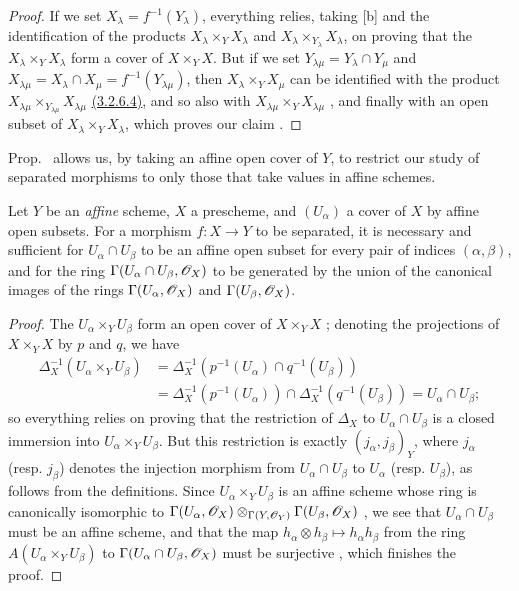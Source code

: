 \begin{proof}
\label{proof-1.5.5.5}
If we set $X_\lambda=f^{-1}(Y_\lambda)$, everything relies, taking [b] and the identification of the products $X_\lambda\times_Y X_\lambda$ and $X_\lambda\times_{Y_\lambda}X_\lambda$, on proving that the $X_\lambda\times_Y X_\lambda$ form a cover of $X\times_Y X$.
But if we set $Y_{\lambda\mu}=Y_\lambda\cap Y_\mu$ and $X_{\lambda\mu}=X_\lambda\cap X_\mu=f^{-1}(Y_{\lambda\mu})$, then $X_\lambda\times_Y X_\mu$ can be identified with the product $X_{\lambda\mu}\times_{Y_{\lambda\mu}}X_{\lambda\mu}$ \hyperref[1.3.2.6]{(3.2.6.4)}, and so also with $X_{\lambda\mu}\times_Y X_{\lambda\mu}$ , and finally with an open subset of $X_\lambda\times_Y X_\lambda$, which proves our claim .
\end{proof}

Prop.~ allows us, by taking an affine open cover of $Y$, to restrict our study of separated morphisms to only those that take values in affine schemes.

\begin{prop}[5.5.6]
\label{1.5.5.6}
Let $Y$ be an \emph{affine} scheme, $X$ a prescheme, and $(U_\alpha)$ a cover of $X$ by affine open subsets.
For a morphism $f:X\to Y$ to be separated, it is necessary and sufficient for $U_\alpha\cap U_\beta$ to be an affine open subset for every pair of indices $(\alpha,\beta)$, and for the ring $\Gamma(U_\alpha\cap U_\beta,\mathscr{O}_X)$ to be generated by the union of the canonical images of the rings $\Gamma(U_\alpha,\mathscr{O}_X)$ and $\Gamma(U_\beta,\mathscr{O}_X)$.
\end{prop}

\begin{proof}
\label{proof-1.5.5.6}
The $U_\alpha\times_Y U_\beta$ form an open cover of $X\times_Y X$ ;
denoting the projections of $X\times_Y X$ by $p$ and $q$, we have
\begin{align*}
  \Delta_X^{-1}(U_\alpha\times_Y U_\beta)&=\Delta_X^{-1}(p^{-1}(U_\alpha)\cap q^{-1}(U_\beta))\\
                                         &=\Delta_X^{-1}(p^{-1}(U_\alpha))\cap\Delta_X^{-1}(q^{-1}(U_\beta))=U_\alpha\cap U_\beta;
\end{align*}
so everything relies on proving that the restriction of $\Delta_X$ to $U_\alpha\cap U_\beta$ is a closed immersion into $U_\alpha\times_Y U_\beta$.
But this restriction is exactly $(j_\alpha,j_\beta)_Y$, where $j_\alpha$ (resp. $j_\beta$) denotes the injection morphism from $U_\alpha\cap U_\beta$ to $U_\alpha$ (resp. $U_\beta$), as follows from the definitions.
Since $U_\alpha\times_Y U_\beta$ is an affine scheme whose ring is canonically isomorphic to $\Gamma(U_\alpha,\mathscr{O}_X)\otimes_{\Gamma(Y,\mathscr{O}_Y)}\Gamma(U_\beta,\mathscr{O}_X)$ , we see that $U_\alpha\cap U_\beta$ must be an affine scheme, and that the map $h_\alpha\otimes h_\beta\mapsto h_\alpha h_\beta$ from the ring $A(U_\alpha\times_Y U_\beta)$ to $\Gamma(U_\alpha\cap U_\beta,\mathscr{O}_X)$ must be surjective , which finishes the proof.
\end{proof}

